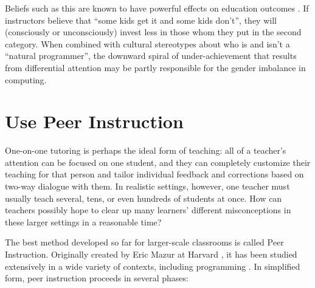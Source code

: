 Beliefs such as this are known to have powerful effects on education
outcomes \cite{Alvi1999,Brop1983,Juss2005}.  If instructors
believe that ``some kids get it and some kids don't'', they will
(consciously or unconsciously) invest less in those whom they put in
the second category.  When combined with cultural stereotypes about
who is and isn't a ``natural programmer'', the downward spiral of
under-achievement that results from differential attention may be
partly responsible for the gender imbalance in computing.

\section*{Use Peer Instruction}

One-on-one tutoring is perhaps the ideal form of teaching: all of a
teacher's attention can be focused on one student, and they can
completely customize their teaching for that person and tailor
individual feedback and corrections based on two-way dialogue with
them.  In realistic settings, however, one teacher must usually teach
several, tens, or even hundreds of students at once.  How can teachers
possibly hope to clear up many learners' different misconceptions in
these larger settings in a reasonable time?

The best method developed so far for larger-scale classrooms is called
Peer Instruction.  Originally created by Eric Mazur at Harvard
\cite{Mazu1996}, it has been studied extensively in a wide variety of
contexts, including programming \cite{Port2011,Port2013}.  In
simplified form, peer instruction proceeds in several phases:

